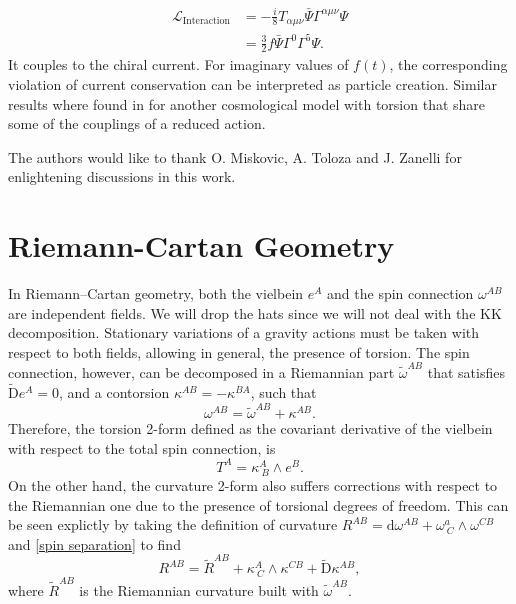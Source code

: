 \documentclass[aps,prd,12pt,superscriptaddress,showpacs,showkeys,longbibliography,reprint]{revtex4-1}
\begin{document}
\begin{align*}
\mathcal{L}_{\text{Interaction}}&=-\frac{i}{8}T_{\alpha\mu\nu}\bar{\Psi}\Gamma^{\alpha\mu\nu}\Psi\\
&=\frac{3}{2}f\bar{\Psi}\Gamma^0\Gamma^5\Psi.
\end{align*}
It couples to the chiral current. For imaginary values of $f(t)$, the corresponding violation of current conservation can be interpreted as particle creation. Similar results where found in \cite{Toloza:2013wi} for another cosmological model with torsion that share some of the couplings of a reduced action. 
\begin{acknowledgments}
The authors would like to thank O. Miskovic, A. Toloza and J. Zanelli for enlightening discussions in this work.
\end{acknowledgments}


\appendix
\section{Riemann-Cartan Geometry}\label{Riemann-Cartan}
In Riemann--Cartan geometry, both the vielbein $e^A$ and the spin connection $\omega^{AB}$ are independent fields. We will drop the hats since we will not deal with the KK decomposition. Stationary variations of a gravity actions must be taken with respect to both fields, allowing in general, the presence of torsion. The spin connection, however, can be decomposed in a Riemannian part $\tilde{\omega}^{AB}$ that satisfies $\tilde{\mbox{D}}e^A=0$, and a contorsion $\kappa^{AB}=-\kappa^{BA}$, such that 
\begin{equation}\label{spin separation}
  \omega^{AB}=\tilde{\omega}^{AB}+\kappa^{AB}.
\end{equation} 
Therefore, the torsion 2-form defined as the covariant derivative of the vielbein with respect to the total spin connection, is
\begin{equation}
  T^A=\kappa^A_{\ B}\wedge e^B.
\end{equation}
On the other hand, the curvature 2-form also suffers corrections with respect to the Riemannian one due to the presence of torsional degrees of freedom. This can be seen explictly by taking the definition of curvature $R^{AB}=\mbox{d}\omega^{AB}+\omega^a_{\ C}\wedge\omega^{CB}$ and \eqref{spin separation} to find
\begin{equation}\label{curvature decomp}
  R^{AB}=\tilde{R}^{AB}+\kappa^A_{\ C}\wedge\kappa^{CB}+\tilde{\mbox{D}}\kappa^{AB},
\end{equation}
where $\tilde{R}^{AB}$ is the Riemannian curvature built with $\tilde{\omega}^{AB}$.
\end{document}

